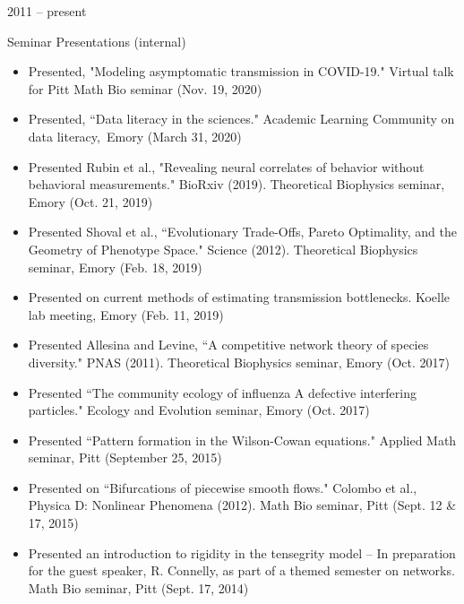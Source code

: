 \documentclass[a4paper,10pt]{article}
\newlength{\cvcolumngapwidth}
\newlength{\cvleftcolumnwidth}
\newlength{\cvrightcolumnwidth}
\newcommand{\cvtitlestyle}[1]{{\large\cvtitlefont\textcolor{cvtitlecolor}{#1}}}
\newcommand{\cvdurationstyle}[1]{{\small\cvdurationfont\textcolor{cvdurationcolor}{#1}}}
\newlength{\cvafteritemskipamount}
\newlength{\cvaftertitleskipamount}
\newlength{\cvparskip}
\newcommand{\cvitem}[2]{
    \begin{minipage}[t]{\cvleftcolumnwidth}
        \raggedleft #1
    \end{minipage}%
    \hspace{\cvcolumngapwidth}%
    \begin{minipage}[t]{\cvrightcolumnwidth}
        \setlength{\parskip}{\cvparskip} #2
    \end{minipage}

    \vspace{\cvafteritemskipamount}
}
\newcommand{\cvtitle}[1]{
    \cvtitlestyle{#1}

    \vspace{\cvaftertitleskipamount}
    \vspace{-\cvparskip}
}
\begin{document}
\cvitem{
    \cvdurationstyle{2011 -- present}
}{
    \cvtitle{Seminar Presentations (internal)}
    \begin{itemize}[leftmargin=*]
	\item Presented, "Modeling asymptomatic transmission in COVID-19." Virtual talk for Pitt Math Bio seminar (Nov. 19, 2020) \\
    	\item Presented, ``Data literacy in the sciences."  Academic Learning Community on data literacy,\, Emory (March 31, 2020)\\
    	\item Presented Rubin et al., "Revealing neural correlates of behavior without behavioral measurements." BioRxiv (2019). Theoretical Biophysics seminar, Emory (Oct. 21, 2019) \\
        \item Presented Shoval et al., ``Evolutionary Trade-Offs, Pareto Optimality, and the Geometry of Phenotype Space." Science (2012). Theoretical Biophysics seminar, Emory (Feb. 18, 2019) \\
        \item Presented on current methods of estimating transmission bottlenecks. Koelle lab meeting, Emory (Feb. 11, 2019) \\
        \item Presented Allesina and Levine, ``A competitive network theory of species diversity." PNAS (2011). Theoretical Biophysics seminar, Emory (Oct. 2017) \\
        \item Presented  ``The community ecology of influenza A defective interfering particles." Ecology and Evolution seminar, Emory (Oct. 2017) \\
    \end{itemize}
    \begin{itemize}[leftmargin=*]
        \item Presented ``Pattern formation in the Wilson-Cowan equations." Applied Math seminar, Pitt (September 25, 2015) \\
        \item Presented on ``Bifurcations of piecewise smooth flows." Colombo et al., Physica D: Nonlinear Phenomena (2012). Math Bio seminar, Pitt (Sept. 12 \& 17, 2015) \\
        \item Presented an introduction to rigidity in the tensegrity model -- In preparation for the guest speaker, R. Connelly, as part of a themed semester on networks. Math Bio seminar, Pitt (Sept. 17, 2014) \\

\end{itemize}}
\end{document}
